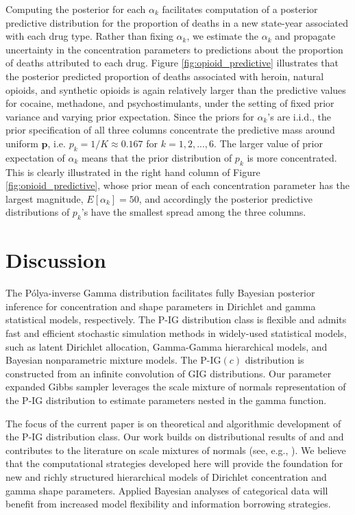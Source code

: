 \documentclass{statsoc}
\newcommand{\p}{\bm{p}}
\begin{document}
Computing the posterior for each $\alpha_k$ facilitates computation of a posterior predictive distribution for the proportion of deaths in a new state-year associated with each drug type.  Rather than fixing $\alpha_k$, we estimate the $\alpha_k$ and propagate uncertainty in the concentration parameters to predictions about the proportion of deaths attributed to each drug.  Figure \ref{fig:opioid_predictive} illustrates that the posterior predicted proportion of deaths associated with heroin, natural opioids, and synthetic opioids is again relatively larger than the predictive values for cocaine, methadone, and psychostimulants, under the setting of fixed prior variance and varying prior expectation. Since the priors for $\alpha_k$'s are i.i.d.,  the prior specification of all  three columns concentrate the predictive mass around uniform $\p$, i.e. $p_k = 1/K\approx 0.167$ for $k=1,2,...,6$. The larger value of prior expectation of $\alpha_k$ means that the prior distribution of $p_k$ is more concentrated. This is clearly illustrated in the right hand column of Figure \ref{fig:opioid_predictive}, whose prior mean of each concentration parameter has the largest magnitude, $E[\alpha_k] = 50$, and accordingly the posterior predictive distributions of $p_k$'s have the smallest spread among the three columns.

\section{Discussion}
\label{sec:Discussion}
The P\'olya-inverse Gamma distribution facilitates fully Bayesian posterior inference for concentration and shape parameters in Dirichlet and gamma statistical models, respectively.  The P-IG distribution class is flexible and admits fast and efficient stochastic simulation methods in widely-used statistical models, such as latent Dirichlet allocation, Gamma-Gamma hierarchical models, and Bayesian nonparametric mixture models.  The P-IG$\left(c\right)$ distribution is constructed from an infinite convolution of GIG distributions. Our parameter expanded Gibbs sampler leverages the scale mixture of normals representation of the P-IG distribution to estimate parameters nested in the gamma function.      

The focus of the current paper is on theoretical and algorithmic development of the P-IG distribution class.  Our work builds on distributional results of \citet{hartman1976completely} and \citet{roynette2005couples} and contributes to the literature on scale mixtures of normals (see, e.g., \cite{andrews1974scale, west1987scale, polson2013bayesian}).  We believe that the computational strategies developed here will provide the foundation for new and richly structured hierarchical models of Dirichlet concentration and gamma shape parameters.  Applied Bayesian analyses of categorical data will benefit from increased model flexibility and information borrowing strategies.       
\end{document}
